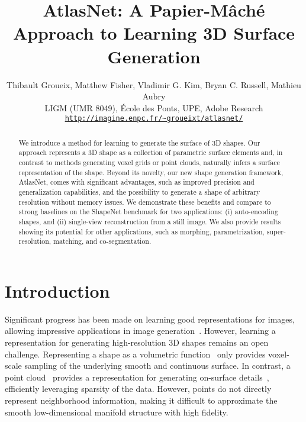 \documentclass[10pt,twocolumn,letterpaper]{article}
\newcommand{\ournet}{AtlasNet}
\begin{document}
\title{AtlasNet: A Papier-M\^ach\'e Approach to Learning 3D Surface Generation}




\author{
Thibault Groueix, Matthew Fisher, Vladimir G. Kim, Bryan C. Russell, Mathieu Aubry\\
LIGM (UMR 8049), \'Ecole des Ponts, UPE, Adobe Research\\
{\tt\small \url{http://imagine.enpc.fr/~groueixt/atlasnet/}}\\
}

\maketitle


\begin{abstract}
\vspace{-3mm}

We introduce a method for learning to generate the surface of 3D shapes. 
Our approach represents a 3D shape as a collection of parametric surface elements and, in contrast to methods generating voxel grids or point clouds, naturally infers a surface representation of the shape.
Beyond its novelty, our new shape generation framework, \ournet{}, comes with significant advantages, such as improved precision and generalization capabilities, and the possibility to generate a shape of arbitrary resolution without memory issues. 
We demonstrate these benefits and compare to strong baselines on the ShapeNet benchmark for two applications: (i) auto-encoding shapes, and (ii) single-view reconstruction from a still image.
We also provide results showing its potential for other applications, such as morphing, parametrization, super-resolution, matching, and co-segmentation.
\end{abstract}
\vspace{-6mm}

\section{Introduction}
\vspace{-2mm}
Significant progress has been made on learning good representations for images, allowing impressive applications in image generation~\cite{Isola:2017,Zhu:2017:cylcegan}. However, learning a representation for generating high-resolution 3D shapes remains an open challenge. Representing a shape as a volumetric function~\cite{choy20163d,Hane:2017,TDB17b} only provides voxel-scale sampling of the underlying smooth and continuous surface. In contrast, a point cloud~\cite{qi2016pointnet,Qi:2017:nips} provides a representation for generating on-surface details~\cite{Fan:2017:cvpr}, efficiently leveraging sparsity of the data. However, points do not directly represent neighborhood information, making it difficult to approximate the smooth low-dimensional manifold structure with high fidelity. 
\end{document}

